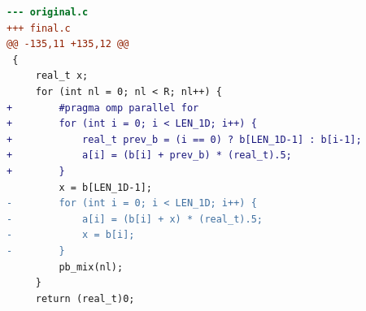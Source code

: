 \begin{lstlisting}[language=diff,basicstyle=\ttfamily\scriptsize,breaklines=true,caption={tsvc/s254 — FASTER (e1_r_b)}]
--- original.c
+++ final.c
@@ -135,11 +135,12 @@
 {
     real_t x;
     for (int nl = 0; nl < R; nl++) {
+        #pragma omp parallel for 
+        for (int i = 0; i < LEN_1D; i++) {
+            real_t prev_b = (i == 0) ? b[LEN_1D-1] : b[i-1];
+            a[i] = (b[i] + prev_b) * (real_t).5;
+        }
         x = b[LEN_1D-1];
-        for (int i = 0; i < LEN_1D; i++) {
-            a[i] = (b[i] + x) * (real_t).5;
-            x = b[i];
-        }
         pb_mix(nl);
     }
     return (real_t)0;
\end{lstlisting}
